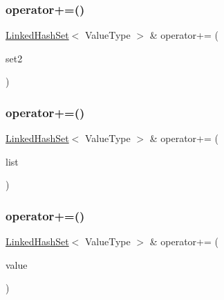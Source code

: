 \mbox{\label{classLinkedHashSet_a5d639abbe4ef9c9b1db9eaa994bc0a92}} 
\subsubsection{\texorpdfstring{operator+=()}{operator+=()}\hspace{0.1cm}{\footnotesize\ttfamily [1/3]}}
{\footnotesize\ttfamily \mbox{\hyperlink{classLinkedHashSet}{Linked\+Hash\+Set}}$<$ Value\+Type $>$ \& operator+= (\begin{DoxyParamCaption}\item[{const \mbox{\hyperlink{classLinkedHashSet}{Linked\+Hash\+Set}}$<$ Value\+Type $>$ \&}]{set2 }\end{DoxyParamCaption})}

\mbox{\label{classLinkedHashSet_a013dbb723a689628f8f468cec87a2110}} 
\subsubsection{\texorpdfstring{operator+=()}{operator+=()}\hspace{0.1cm}{\footnotesize\ttfamily [2/3]}}
{\footnotesize\ttfamily \mbox{\hyperlink{classLinkedHashSet}{Linked\+Hash\+Set}}$<$ Value\+Type $>$ \& operator+= (\begin{DoxyParamCaption}\item[{std\+::initializer\+\_\+list$<$ Value\+Type $>$}]{list }\end{DoxyParamCaption})}

\mbox{\label{classLinkedHashSet_afdf15a8116d4641e68e1088131e7fcf7}} 
\subsubsection{\texorpdfstring{operator+=()}{operator+=()}\hspace{0.1cm}{\footnotesize\ttfamily [3/3]}}
{\footnotesize\ttfamily \mbox{\hyperlink{classLinkedHashSet}{Linked\+Hash\+Set}}$<$ Value\+Type $>$ \& operator+= (\begin{DoxyParamCaption}\item[{const Value\+Type \&}]{value }\end{DoxyParamCaption})}

